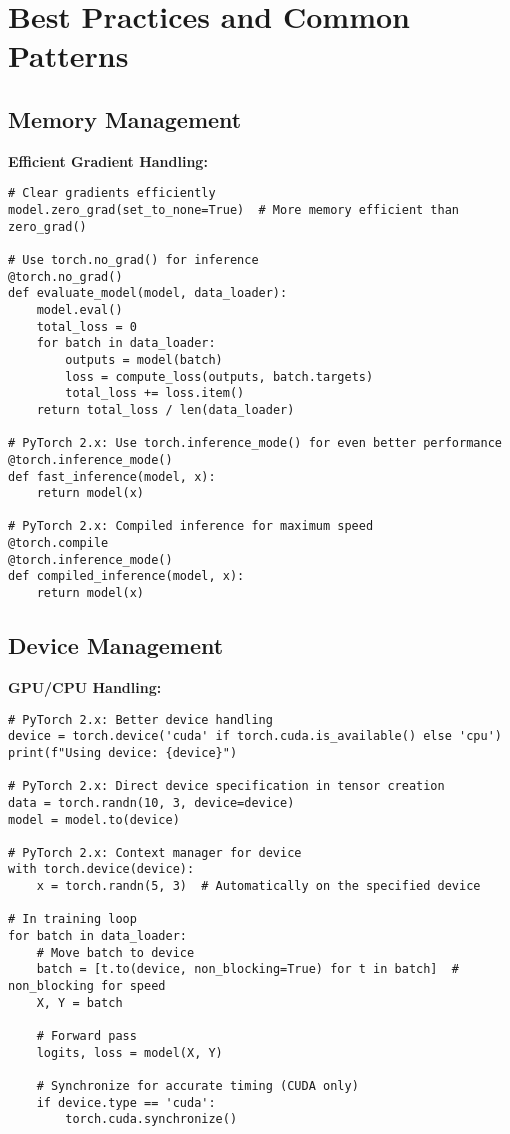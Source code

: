 \documentclass[11pt,a4paper]{book}
\begin{document}
\chapter{Best Practices and Common Patterns}

\section{Memory Management}

\textbf{Efficient Gradient Handling:}
\begin{verbatim}
# Clear gradients efficiently
model.zero_grad(set_to_none=True)  # More memory efficient than zero_grad()

# Use torch.no_grad() for inference
@torch.no_grad()
def evaluate_model(model, data_loader):
    model.eval()
    total_loss = 0
    for batch in data_loader:
        outputs = model(batch)
        loss = compute_loss(outputs, batch.targets)
        total_loss += loss.item()
    return total_loss / len(data_loader)

# PyTorch 2.x: Use torch.inference_mode() for even better performance
@torch.inference_mode()
def fast_inference(model, x):
    return model(x)

# PyTorch 2.x: Compiled inference for maximum speed
@torch.compile
@torch.inference_mode()
def compiled_inference(model, x):
    return model(x)
\end{verbatim}

\section{Device Management}

\textbf{GPU/CPU Handling:}
\begin{verbatim}
# PyTorch 2.x: Better device handling
device = torch.device('cuda' if torch.cuda.is_available() else 'cpu')
print(f"Using device: {device}")

# PyTorch 2.x: Direct device specification in tensor creation
data = torch.randn(10, 3, device=device)
model = model.to(device)

# PyTorch 2.x: Context manager for device
with torch.device(device):
    x = torch.randn(5, 3)  # Automatically on the specified device

# In training loop
for batch in data_loader:
    # Move batch to device
    batch = [t.to(device, non_blocking=True) for t in batch]  # non_blocking for speed
    X, Y = batch
    
    # Forward pass
    logits, loss = model(X, Y)
    
    # Synchronize for accurate timing (CUDA only)
    if device.type == 'cuda':
        torch.cuda.synchronize()
\end{verbatim}
\end{document}
